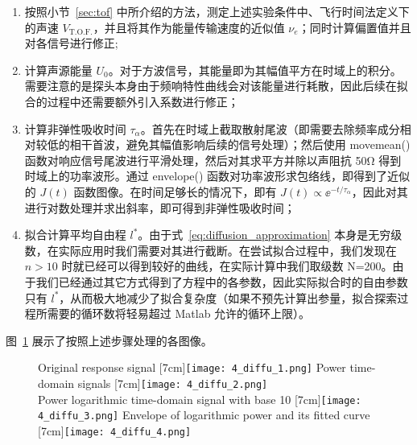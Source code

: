 \begin{enumerate}
  \item 按照小节~\ref{sec:tof} 中所介绍的方法，测定上述实验条件中、飞行时间法定义下的声速 $V_{\text{T.O.F.}}$，并且将其作为能量传输速度的近似值 $\nu_{e}$；同时计算偏置值并且对各信号进行修正;
  \item 计算声源能量 $U_{0}$。对于方波信号，其能量即为其幅值平方在时域上的积分。需要注意的是探头本身由于频响特性曲线会对该能量进行耗散，因此后续在拟合的过程中还需要额外引入系数进行修正；
  \item 计算非弹性吸收时间 $\tau_{\alpha}$。首先在时域上截取散射尾波（即需要去除频率成分相对较低的相干首波，避免其幅值影响后续的信号处理）；然后使用 movemean() 函数对响应信号尾波进行平滑处理，然后对其求平方并除以声阻抗 50\unit{\ohm} 得到时域上的功率波形。通过 envelope() 函数对功率波形求包络线，即得到了近似的 $J(t)$ 函数图像。在时间足够长的情况下，即有 $J(t)\propto {\ee}^{-t/\tau_{\alpha}}$，因此对其进行对数处理并求出斜率，即可得到非弹性吸收时间；
  \item 拟合计算平均自由程 $l^{*}$。由于式~\eqref{eq:diffusion_approximation} 本身是无穷级数，在实际应用时我们需要对其进行截断。在尝试拟合过程中，我们发现在 $n>10$ 时就已经可以得到较好的曲线，在实际计算中我们取级数 N=200。由于我们已经通过其它方式得到了方程中的各参数，因此实际拟合时的自由参数只有 $l^{*}$，从而极大地减少了拟合复杂度（如果不预先计算出参量，拟合探索过程所需要的循环数将轻易超过 Matlab 允许的循环上限）。
\end{enumerate}

图~\ref{fig:diffusion_approximation} 展示了按照上述步骤处理的各图像。

\begin{figure}[htb]
  \centering
                  {Original response signal}%
                  [7cm]{\texttt{[image: 4\_diffu\_1.png]}}
  \hfill
                  {Power time-domain signals}%
                  [7cm]{\texttt{[image: 4\_diffu\_2.png]}}
  \\
                  {Power logarithmic time-domain signal with base 10}%
                  [7cm]{\texttt{[image: 4\_diffu\_3.png]}}
  \hfill
                  {Envelope of logarithmic power and its fitted curve}%
                  [7cm]{\texttt{[image: 4\_diffu\_4.png]}}
  \label{fig:diffusion_approximation}
  \end{figure}

